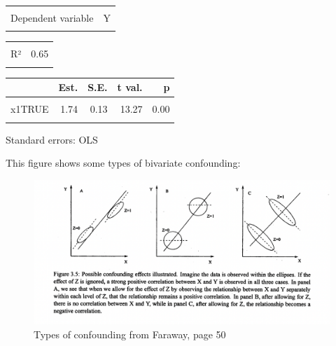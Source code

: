\documentclass[
  letterpaper,
  DIV=11,
  numbers=noendperiod]{scrreport}
\begin{document}
\begin{table}[!h]
\centering
\begin{tabular}{lr}
\toprule
\cellcolor{gray!6}{Observations} & \cellcolor{gray!6}{100}\\
Dependent variable & Y\\
\cellcolor{gray!6}{Type} & \cellcolor{gray!6}{OLS linear regression}\\
\bottomrule
\end{tabular}
\end{table} \begin{table}[!h]
\centering
\begin{tabular}{lr}
\toprule
\cellcolor{gray!6}{F(2,97)} & \cellcolor{gray!6}{89.79}\\
R² & 0.65\\
\cellcolor{gray!6}{Adj. R²} & \cellcolor{gray!6}{0.64}\\
\bottomrule
\end{tabular}
\end{table} \begin{table}[!h]
\centering
\begin{threeparttable}
\begin{tabular}{lrrrr}
\toprule
  & Est. & S.E. & t val. & p\\
\midrule
\cellcolor{gray!6}{(Intercept)} & \cellcolor{gray!6}{4.44} & \cellcolor{gray!6}{1.29} & \cellcolor{gray!6}{3.46} & \cellcolor{gray!6}{0.00}\\
x1TRUE & 1.74 & 0.13 & 13.27 & 0.00\\
\cellcolor{gray!6}{x2} & \cellcolor{gray!6}{-0.18} & \cellcolor{gray!6}{0.40} & \cellcolor{gray!6}{-0.45} & \cellcolor{gray!6}{0.66}\\
\bottomrule
\end{tabular}
\begin{tablenotes}
\item Standard errors: OLS
\end{tablenotes}
\end{threeparttable}
\end{table}

This figure shows some types of bivariate confounding:

\begin{figure}

{\centering \includegraphics{week2/images/faraway_page50.png}

}

\caption{Types of confounding from Faraway, page 50}

\end{figure}
\end{document}
